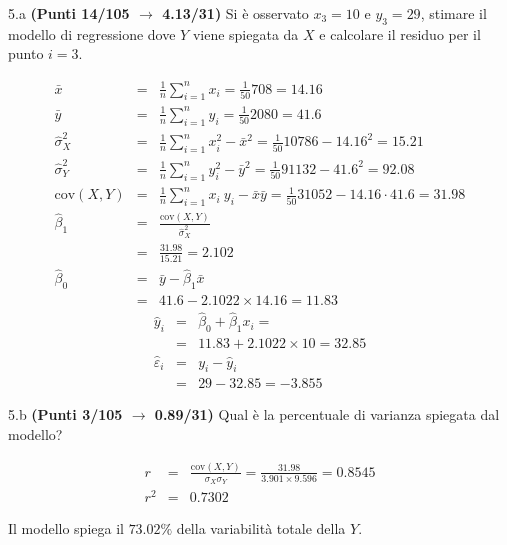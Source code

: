 \documentclass[
  11pt,
]{book}
\theoremstyle{mytheoremstyle}
\theoremstyle{mydefstyle}
\newenvironment{sol}
  {
  \begin{tcolorbox}[enhanced,breakable,arc=0.1mm,boxrule=1pt,colback=white,colframe=iblue,
  title=\bf \fontfamily{lmss}\selectfont \hspace{.5 cm} Soluzione,drop fuzzy shadow]

}{
\end{tcolorbox}
  }
\begin{document}
5.a \textbf{(Punti 14/105 \(\rightarrow\) 4.13/31)} Si è osservato \(x_3=10\) e \(y_3=29\), stimare il modello di regressione dove \(Y\) viene spiegata da \(X\) e calcolare il residuo per il punto \(i=3\).

\begin{sol}
\begin{eqnarray*}
           \bar x &=&\frac 1 n\sum_{i=1}^n x_i = \frac {1}{ 50 }  708 =  14.16 \\
           \bar y &=&\frac 1 n\sum_{i=1}^n y_i = \frac {1}{ 50 }  2080 =  41.6 \\
           \hat\sigma_X^2&=&\frac 1 n\sum_{i=1}^n x_i^2-\bar x^2=\frac {1}{ 50 }  10786  - 14.16 ^2= 15.21 \\
           \hat\sigma_Y^2&=&\frac 1 n\sum_{i=1}^n y_i^2-\bar y^2=\frac {1}{ 50 }  91132  - 41.6 ^2= 92.08 \\
           \text{cov}(X,Y)&=&\frac 1 n\sum_{i=1}^n x_i~y_i-\bar x\bar y=\frac {1}{ 50 }  31052 - 14.16 \cdot 41.6 = 31.98 \\
           \hat\beta_1 &=& \frac{\text{cov}(X,Y)}{\hat\sigma_X^2} \\
                    &=& \frac{ 31.98 }{ 15.21 }  =  2.102 \\
           \hat\beta_0 &=& \bar y - \hat\beta_1 \bar x\\
                    &=&  41.6 - 2.1022 \times  14.16 = 11.83 
         \end{eqnarray*}\begin{eqnarray*}
\hat y_i &=&\hat\beta_0+\hat\beta_1 x_i=\\ 
&=& 11.83 + 2.1022 \times 10 = 32.85 \\ 
\hat \varepsilon_i &=& y_i-\hat y_i\\ 
&=& 29 - 32.85 = -3.855  
\end{eqnarray*}

\end{sol}

5.b \textbf{(Punti 3/105 \(\rightarrow\) 0.89/31)} Qual è la percentuale di varianza spiegata dal modello?

\begin{sol}
\begin{eqnarray*}
r&=&\frac{\text{cov}(X,Y)}{\sigma_X\sigma_Y}=\frac{ 31.98 }{ 3.901 \times 9.596 }= 0.8545 \\ 
r^2&=& 0.7302\end{eqnarray*}

Il modello spiega il \(73.02\%\) della variabilità totale della \(Y\).

\end{sol}
\end{document}
